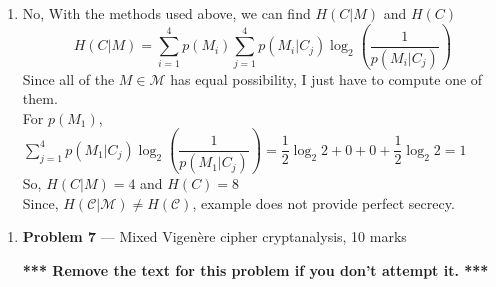 \documentclass[11pt]{article}
\theoremstyle{definition}
\begin{document}
\begin{enumerate}
\begin{enumerate}
			
			\item No, 
			With the methods used above, we can find $H(C|M)$ and $H(C)$\\
			\[H(C|M) = \sum_{i=1}^{4}p(M_{i}) \sum_{j=1}^{4} p(M_{i}|C_{j})\log_{2}(\dfrac{1}{p(M_{i}|C_{j})})\]
			Since all of the $M \in \mathcal{M}$ has equal possibility, I just have to compute one of them.\\
			For $p(M_{1})$, $\sum_{j=1}^{4} p(M_{1}|C_{j})\log_{2}(\dfrac{1}{p(M_{1}|C_{j})}) = \dfrac{1}{2} \log_{2} 2 + 0 + 0 + \dfrac{1}{2} \log_{2} 2 = 1$\\
			So, $H(C|M) = 4 $ and $H(C) = 8$\\
			Since, $H(\mathcal{C}|\mathcal{M}) \ne H(\mathcal{C})$, example does not provide perfect secrecy.
			
		\end{enumerate}
	\end{enumerate}
	
	
	\begin{enumerate}
	
		
		\item[] \textbf{Problem 7} --- Mixed Vigen\`ere cipher cryptanalysis, 10 marks
		
		\textbf{*** Remove the text for this problem if you don't attempt it. ***}
	
	
	\end{enumerate}
\end{document}
